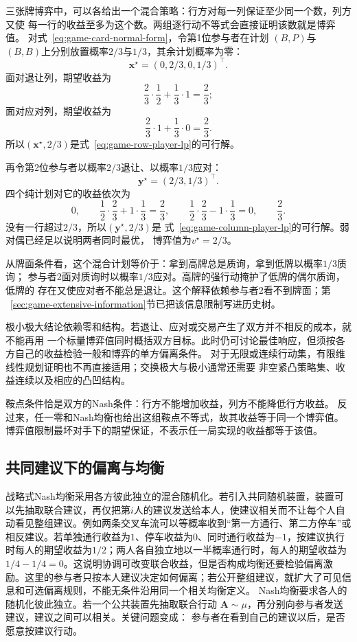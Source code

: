 三张牌博弈中，可以各给出一个混合策略：行方对每一列保证至少同一个数，列方又使
每一行的收益至多为这个数。两组逐行动不等式会直接证明该数就是博弈值。
对式~\eqref{eq:game-card-normal-form}，令第1位参与者在计划
\((B,P)\)与\((B,B)\)上分别放置概率\(2/3\)与\(1/3\)，其余计划概率为零：
\[
  \bm{x}^\star
  =
  (0,2/3,0,1/3)^{\top}.
\]
面对退让列，期望收益为
\[
  \frac23\cdot\frac12+\frac13\cdot1
  =
  \frac23;
\]
面对应对列，期望收益为
\[
  \frac23\cdot1+\frac13\cdot0
  =
  \frac23.
\]
所以\((\bm{x}^\star,2/3)\)是式~\eqref{eq:game-row-player-lp}的可行解。

再令第2位参与者以概率\(2/3\)退让、以概率\(1/3\)应对：
\[
  \bm{y}^\star=(2/3,1/3)^{\top}.
\]
四个纯计划对它的收益依次为
\[
  0,\qquad
  \frac12\cdot\frac23+1\cdot\frac13=\frac23,\qquad
  \frac12\cdot\frac23-1\cdot\frac13=0,\qquad
  \frac23.
\]
没有一行超过\(2/3\)，所以\((\bm{y}^\star,2/3)\)是
式~\eqref{eq:game-column-player-lp}的可行解。弱对偶已经足以说明两者同时最优，
博弈值为\(v^\star=2/3\)。

从牌面条件看，这个混合计划等价于：拿到高牌总是质询，拿到低牌以概率\(1/3\)质询；
参与者2面对质询时以概率\(1/3\)应对。高牌的强行动掩护了低牌的偶尔质询，低牌的
存在又使应对者不能总是退让。这个解释依赖参与者2看不到牌面；第
~\ref{sec:game-extensive-information}节已把该信息限制写进历史树。

极小极大结论依赖零和结构。若退让、应对或交易产生了双方并不相反的成本，就不能再用
一个标量博弈值同时概括双方目标。此时仍可讨论最佳响应，但须按各方自己的收益检验一般和博弈的单方偏离条件。
对于无限或连续行动集，有限维线性规划证明也不再直接适用；交换极大与极小通常还需要
非空紧凸策略集、收益连续以及相应的凸凹结构。

鞍点条件恰是双方的Nash条件：行方不能增加收益，列方不能降低行方收益。
反过来，任一零和Nash均衡也给出这组鞍点不等式，故其收益等于同一个博弈值。
博弈值限制最坏对手下的期望保证，不表示任一局实现的收益都等于该值。

\subsection{共同建议下的偏离与均衡}
\label{sec:game-correlated-deviations}

战略式Nash均衡采用各方彼此独立的混合随机化。若引入共同随机装置，装置可以先抽取联合建议，再仅把第\(i\)人的建议发送给本人，使建议相关而不让每个人自动看见整组建议。例如两条交叉车流可以等概率收到“第一方通行、第二方停车”或相反建议。若单独通行收益为\(1\)、停车收益为\(0\)、同时通行收益为\(-1\)，按建议执行时每人的期望收益为\(1/2\)；两人各自独立地以一半概率通行时，每人的期望收益为\(1/4-1/4=0\)。这说明协调可改变联合收益，但是否构成均衡还要检验偏离激励。这里的参与者只按本人建议决定如何偏离；若公开整组建议，就扩大了可见信息和可选偏离规则，不能无条件沿用同一个相关均衡定义。
Nash均衡要求各人的随机化彼此独立。若一个公共装置先抽取联合行动
\(\bm{A}\sim\mu\)，再分别向参与者发送建议，建议之间可以相关。关键问题变成：
参与者在看到自己的建议以后，是否愿意按建议行动。


